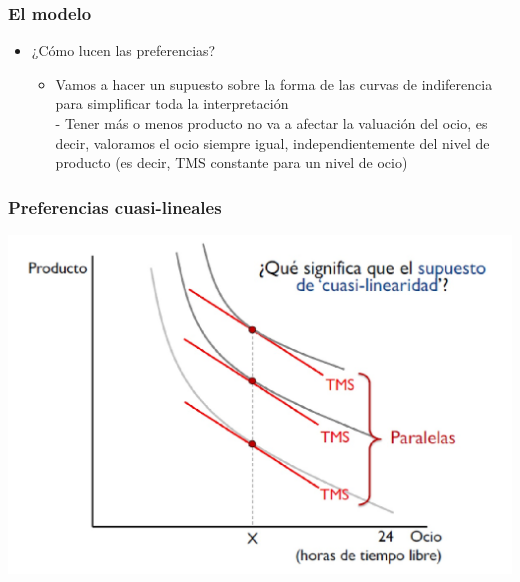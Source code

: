 \documentclass{beamer}
\begin{document}
\begin{frame}
\frametitle{ El modelo}
\begin{itemize}
        \item ¿Cómo lucen las preferencias? \vspace{2mm}
        \begin{itemize}
            \item Vamos a hacer un supuesto sobre la forma de las curvas de indiferencia para simplificar toda la interpretación \\ \vspace{2mm}
            - Tener más o menos producto no va a afectar la valuación del ocio, es decir, valoramos el ocio siempre igual, independientemente del nivel de producto (es decir, TMS constante para un nivel de ocio)
        \end{itemize}
\end{itemize}
\end{frame}

\begin{frame}
\frametitle{Preferencias cuasi-lineales}
\centering
\includegraphics[scale=0.3]{Figures/Tema_04.5_prefcuasilin.jpg}
\end{frame}
\end{document}
